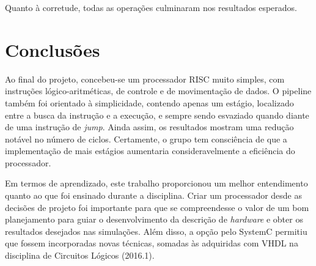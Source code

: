 \documentclass[a4paper]{article}
\begin{document}
Quanto à corretude, todas as operações culminaram nos resultados
esperados.

\newpage

\section{Conclusões}
Ao final do projeto, concebeu-se um processador RISC muito simples,
com instruções lógico-aritméticas, de controle e de movimentação
de dados. O pipeline também foi orientado à simplicidade, contendo
apenas um estágio, localizado entre a busca da instrução e a execução, 
e sempre sendo esvaziado quando diante de uma instrução de \emph{jump}.
Ainda assim, os resultados mostram uma redução notável no número de ciclos.
Certamente, o grupo tem consciência de que a implementação de mais estágios
aumentaria consideravelmente a eficiência do processador.

Em termos de aprendizado, este trabalho proporcionou um melhor entendimento
quanto ao que foi ensinado durante a disciplina. Criar um processador 
desde as decisões de projeto foi importante para que se compreendesse
o valor de um bom planejamento para guiar o desenvolvimento da descrição
de \emph{hardware} e obter os resultados desejados nas simulações. 
Além disso, a opção pelo SystemC permitiu que fossem
incorporadas novas técnicas, somadas às adquiridas com VHDL na disciplina
de Circuitos Lógicos (2016.1).
\end{document}
